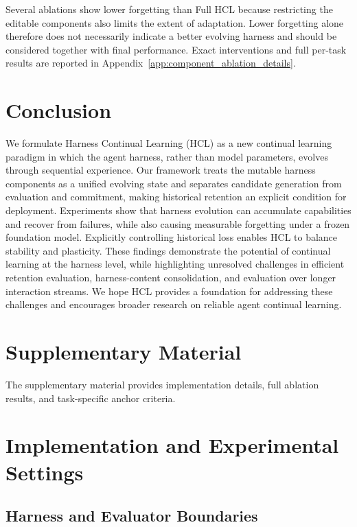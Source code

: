 \documentclass{article}
\begin{document}
Several ablations show lower forgetting than Full HCL because restricting the
editable components also limits the extent of adaptation. Lower forgetting
alone therefore does not necessarily indicate a better evolving harness and should be considered together with final performance. Exact interventions and full per-task
results are reported in Appendix~\ref{app:component_ablation_details}.
\section{Conclusion}
\label{sec:conclusion}
We formulate Harness Continual Learning (HCL) as a new continual learning paradigm in
which the agent harness, rather than model parameters, evolves through
sequential experience. Our framework treats the mutable harness components as a
unified evolving state and separates candidate generation from evaluation and
commitment, making historical retention an explicit condition for deployment.
Experiments show that harness evolution can accumulate capabilities and recover
from failures, while also causing measurable forgetting under a frozen
foundation model. Explicitly controlling historical loss enables HCL to balance
stability and plasticity. These findings demonstrate the potential of continual learning at the harness level, while highlighting unresolved challenges in efficient retention evaluation, harness-content consolidation, and evaluation over longer interaction streams. We hope HCL provides a foundation for addressing these challenges and
encourages broader research on reliable agent continual learning.





\section*{Supplementary Material}

\appendix

The supplementary material provides implementation details, full ablation
results, and task-specific anchor criteria.

\section{Implementation and Experimental Settings}
\label{app:implementation}

\subsection{Harness and Evaluator Boundaries}
\end{document}
